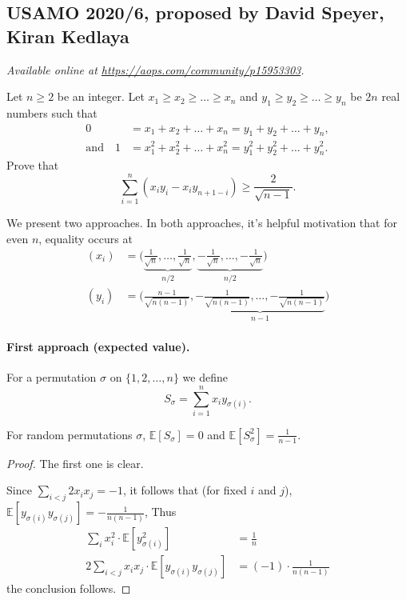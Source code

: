 \documentclass[11pt]{scrartcl}
\begin{document}
\subsection{USAMO 2020/6, proposed by David Speyer, Kiran Kedlaya}
\textsl{Available online at \url{https://aops.com/community/p15953303}.}
\begin{mdframed}[style=mdpurplebox,frametitle={Problem statement}]
Let $n \geq 2$ be an integer.
Let $x_1 \ge x_2 \ge \dots \ge x_n$
and $y_1 \ge y_2 \ge \dots \ge y_n$ be $2n$ real numbers
such that
\begin{align*}
  0 &= x_1 + x_2 + \dots + x_n = y_1 + y_2 + \dots + y_n, \\
  \text{and}\quad
  1 &= x_1^2 + x_2^2 + \dots + x_n^2 = y_1^2 + y_2^2 + \dots + y_n^2.
\end{align*}
Prove that
\[ \sum_{i=1}^n (x_i y_i - x_i y_{n+1-i})
  \geq \frac{2}{\sqrt{n-1}}.  \]
\end{mdframed}
We present two approaches.
In both approaches, it's helpful motivation that
for even $n$, equality occurs at
\begin{align*}
  (x_i) &= \Big(
    \underbrace{\frac{1}{\sqrt n}, \dots, \frac{1}{\sqrt n}}_{n/2},
    \underbrace{-\frac{1}{\sqrt n}, \dots, -\frac{1}{\sqrt n}}_{n/2} \Big) \\
  (y_i) &= \Big( \frac{n-1}{\sqrt{n(n-1)}},
      \underbrace{- \frac{1}{\sqrt{n(n-1)}},
      \dots,
      - \frac{1}{\sqrt{n(n-1)}}}_{n-1} \Big)
\end{align*}

\paragraph{First approach (expected value).}
For a permutation $\sigma$ on $\{1, 2, \dots, n\}$ we define
\[ S_\sigma = \sum_{i=1}^n x_i y_{\sigma(i)}. \]

\begin{claim*}
  For random permutations $\sigma$,
  $\mathbb E[S_\sigma] = 0$
  and $\mathbb E[S_\sigma^2] = \frac{1}{n-1}$.
\end{claim*}
\begin{proof}
  The first one is clear.

  Since $\sum_{i < j} 2x_i x_j = -1$,
  it follows that (for fixed $i$ and $j$),
  $\mathbb E[y_{\sigma(i)} y_{\sigma(j)}] = -\frac{1}{n(n-1)}$,
  Thus
  \begin{align*}
    \sum_{i} x_i^2 \cdot \mathbb E \left[ y_{\sigma(i)}^2 \right]
      &= \frac 1n \\
    2\sum_{i < j} x_i x_j \cdot \mathbb E \left[
      y_{\sigma(i)} y_{\sigma(j)}
      \right] &= (-1) \cdot \frac{1}{n(n-1)}
  \end{align*}
  the conclusion follows.
\end{proof}
\end{document}
